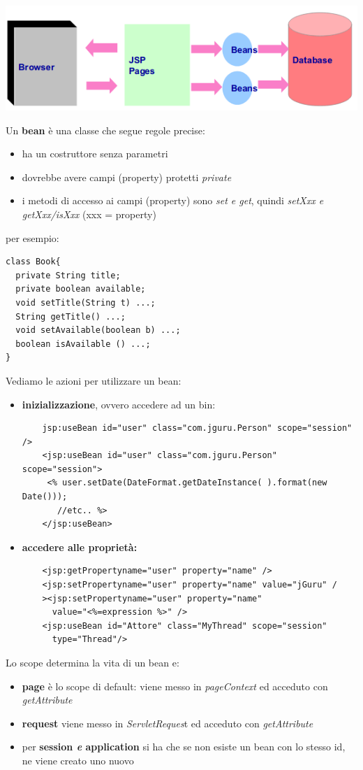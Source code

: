 \documentclass[a4paper,12pt, oneside]{book}
\begin{document}
\begin{center}
	\includegraphics[scale=0.7]{img/mvc.png}
\end{center}
Un \textbf{bean} è una classe che segue regole precise:
\begin{itemize}
	\item ha un costruttore senza parametri
	\item dovrebbe avere campi (property) protetti \textit{private}
	\item i metodi di accesso ai campi (property) sono \textit{set e get}, quindi \textit{setXxx e getXxx/isXxx} (xxx = property) 
\end{itemize}
per esempio:
\begin{verbatim}
class Book{
  private String title;
  private boolean available;
  void setTitle(String t) ...;
  String getTitle() ...;
  void setAvailable(boolean b) ...;
  boolean isAvailable () ...;
}
\end{verbatim}
Vediamo le azioni per utilizzare un bean:
\begin{itemize}
    \item \textbf{inizializzazione}, ovvero accedere ad un bin:
    \begin{verbatim}
    jsp:useBean id="user" class="com.jguru.Person" scope="session" />
    <jsp:useBean id="user" class="com.jguru.Person" scope="session">
     <% user.setDate(DateFormat.getDateInstance( ).format(new Date())); 
       //etc.. %> 
    </jsp:useBean> 
    \end{verbatim}
    \item \textbf{accedere alle proprietà:}
    \begin{verbatim}
    <jsp:getPropertyname="user" property="name" />
    <jsp:setPropertyname="user" property="name" value="jGuru" /
    ><jsp:setPropertyname="user" property="name" 
      value="<%=expression %>" />
    <jsp:useBean id="Attore" class="MyThread" scope="session"
      type="Thread"/>
    \end{verbatim}
\end{itemize}
Lo scope determina la vita di un bean e:
\begin{itemize}
    \item \textbf{page} è lo scope di default: viene messo in \textit{pageContext} ed acceduto con \textit{getAttribute}
    \item \textbf{request} viene messo in \textit{ServletReques}t ed acceduto con \textit{getAttribute}
    \item per \textbf{session \textit{e} application} si ha che se non esiste un bean con lo stesso id, ne viene creato uno nuovo
\end{itemize}
\end{document}
